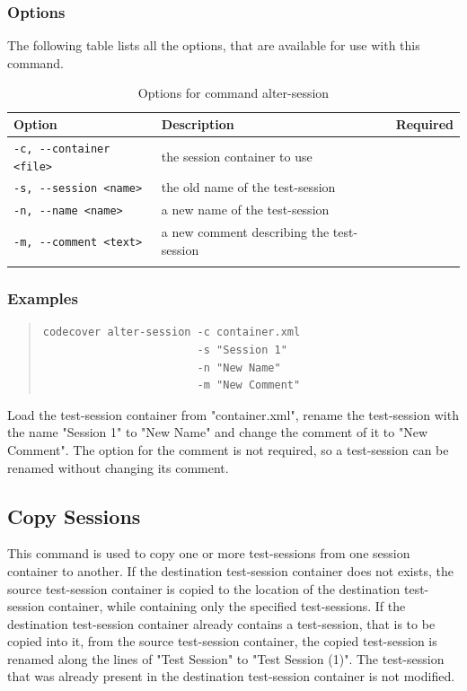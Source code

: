 \subsubsection{Options}\label{command:as:options}
The following table lists all the options, that are available for use with this command.
\begin{longtable}{|l|p{4cm}|c|}\hline
   {\textbf{Option}} & 
   {\textbf{Description}} & 
   {\textbf{Required}} \\\hline \hline \endhead
   \verb$-c, --container <file>$ & the session container to use & \x \\\hline
   \verb$-s, --session <name>$ & the old name of the test-session & \x \\\hline
   \verb$-n, --name <name>$ & a new name of the test-session & \\\hline
   \verb$-m, --comment <text>$ & a new comment describing the test-session & \\\hline
  \caption{Options for command alter-session}
  \label{fr_tb:Options for command alter-session}
\end{longtable}

\subsubsection{Examples}\label{command:as:examples}
\begin{quote}
\begin{verbatim}
codecover alter-session -c container.xml 
                        -s "Session 1"
                        -n "New Name" 
                        -m "New Comment"
\end{verbatim}
\end{quote}
Load the test-session container from "container.xml", rename the test-session with the name "Session 1" to "New Name" and change the comment of it to "New Comment". The option for the comment is not required, so a test-session can be renamed without changing its comment.

\subsection{Copy Sessions}\label{Command-Copy-Sessions}
This command is used to copy one or more test-sessions from one session container to another. \newline
\attention
If the destination test-session container does not exists, the source test-session container is copied to the location of the destination test-session container, while containing only the specified test-sessions.\newline
\attention
If the destination test-session container already contains a test-session, that is to be copied into it, from the source test-session container, the copied test-session is renamed along the lines of "Test Session" to "Test Session (1)". The test-session that was already present in the destination test-session container is not modified. 

